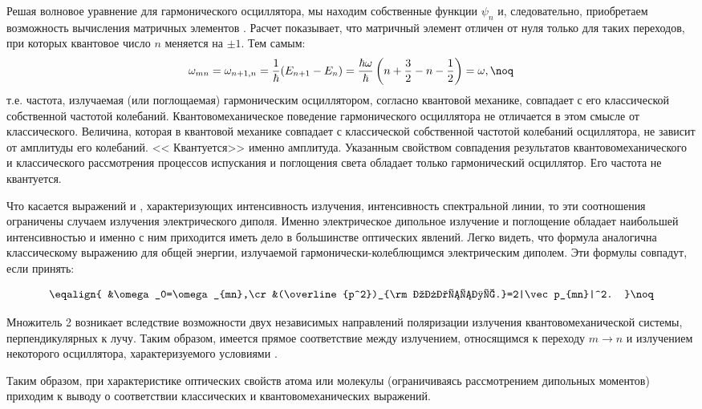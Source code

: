 Решая волновое уравнение для гармонического осциллятора, мы
находим собственные функции $\psi_n$ и, следовательно, приобретаем
возможность вычисления матричных элементов . Расчет
показывает, что матричный элемент отличен от нуля только для таких
переходов, при которых квантовое число $n$ меняется на $\pm 1$.
Тем самым:
$$\omega_{mn}=\omega_{n+1,n}={1\over\hbar}(E_{n+1}-E_n)={\hbar \omega\over\hbar}
\left(n+{3\over2}-n-{1\over2}\right)=\omega,\noq$$ т.е. частота,
излучаемая (или поглощаемая) гармоническим осциллятором, согласно
квантовой механике, совпадает с его классической собственной
частотой колебаний. Квантовомеханическое поведение гармонического
осциллятора не отличается в этом смысле от классического.
Величина, которая в квантовой механике совпадает с классической
собственной частотой колебаний осциллятора, не зависит от
амплитуды его колебаний. << Квантуется>> именно амплитуда.
Указанным свойством совпадения результатов квантовомеханического и
классического рассмотрения процессов испускания и поглощения света
обладает только гармонический осциллятор. Его частота не
квантуется.

Что касается выражений  и , характеризующих
интенсивность излучения, интенсивность спектральной линии, то эти
соотношения ограничены случаем излучения электрического диполя.
Именно электрическое дипольное излучение и поглощение обладает
наибольшей интенсивностью и именно с ним приходится иметь дело в
большинстве оптических явлений. Легко видеть, что формула 
аналогична классическому выражению  для общей энергии,
излучаемой гармонически-колеблющимся электрическим диполем. Эти
формулы совпадут, если принять:
\begin{plain}$$\eqalign{
&\omega_0=\omega_{mn},\cr &(\overline{p^2})_{\rm классич.}=2|\vec
p_{mn}|^2. }\noq$$ 
\end{plain} Множитель 2 возникает вследствие возможности
двух независимых направлений поляризации излучения
квантовомеханической системы, перпендикулярных к лучу. Таким
образом, имеется прямое соответствие между излучением, относящимся
к переходу $m\rightarrow n$ и излучением некоторого осциллятора,
характеризуемого условиями .

Таким образом, при характеристике оптических свойств атома или
молекулы (ограничиваясь рассмотрением дипольных моментов) приходим
к выводу о соответствии классических и квантовомеханических
выражений.

